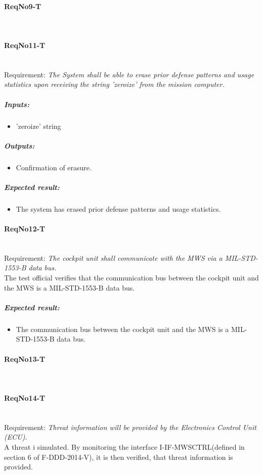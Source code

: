 \paragraph{ReqNo9-T}\mbox{}\\ %


\paragraph{ReqNo11-T}\mbox{}\\ %
Requirement: \textit{The System shall be able to erase prior defense patterns and usage statistics upon receiving the string 'zeroize' from the mission computer.}\\
	\subparagraph{Inputs:}
	\begin{itemize}
	\item 'zeroize' string
	\end{itemize}
	\subparagraph{Outputs:}
	\begin{itemize}
	\item Confirmation of erasure.
	\end{itemize}
	\subparagraph{Expected result:}
	\begin{itemize}
	\item The system has erased prior defense patterns and usage statistics.
	\end{itemize}

\paragraph{ReqNo12-T}\mbox{}\\ %
Requirement: \textit{The cockpit unit shall communicate with the MWS via a MIL-STD-1553-B data bus.}\\
The test official verifies that the communication bus between the cockpit unit and the MWS is a MIL-STD-1553-B data bus.

\subparagraph{Expected result:}
	\begin{itemize}
	\item The communication bus between the cockpit unit and the MWS is a MIL-STD-1553-B data bus.
	\end{itemize}

\paragraph{ReqNo13-T}\mbox{}\\ %

\paragraph{ReqNo14-T}\mbox{}\\ %
Requirement: \textit{Threat information will be provided by the Electronics Control Unit (ECU).}\\
A threat i simulated. By monitoring the interface I-IF-MWSCTRL(defined in section 6 of F-DDD-2014-V), it is then verified, that threat information is provided.


